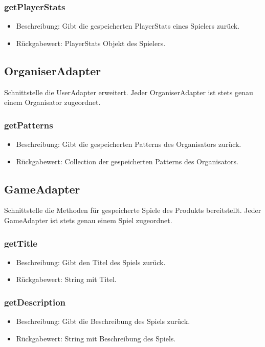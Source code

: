 \documentclass[a4paper]{scrreprt}
\begin{document}
	\subsubsection{getPlayerStats}
	\begin{itemize}
		\item Beschreibung: Gibt die gespeicherten PlayerStats eines Spielers zurück.
		\item Rückgabewert: PlayerStats Objekt des Spielers.
	\end{itemize}

	\subsection{OrganiserAdapter}
	Schnittstelle die UserAdapter erweitert.
	Jeder OrganiserAdapter ist stets genau einem Organisator zugeordnet.

	\subsubsection{getPatterns}
	\begin{itemize}
		\item Beschreibung: Gibt die gespeicherten Patterns des Organisators zurück.
		\item Rückgabewert: Collection der gespeicherten Patterns des Organisators.
	\end{itemize}

	\subsection{GameAdapter}
	Schnittstelle die Methoden für gespeicherte Spiele des Produkts bereitstellt.
	Jeder GameAdapter ist stets genau einem Spiel zugeordnet.

	\subsubsection{getTitle}
	\begin{itemize}
		\item Beschreibung: Gibt den Titel des Spiels zurück.
		\item Rückgabewert: String mit Titel.
	\end{itemize}

	\subsubsection{getDescription}
	\begin{itemize}
		\item Beschreibung: Gibt die Beschreibung des Spiels zurück.
		\item Rückgabewert: String mit Beschreibung des Spiels.
	\end{itemize}
\end{document}
